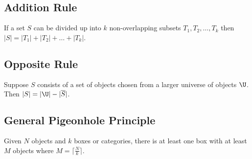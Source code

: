 \documentclass[letterpaper, 12pt]{math}
\begin{document}
\subsection*{Addition Rule}
If a set \( S \) can be divided up into \( k \) non-overlapping subsets
\( T_{1},T_{2},\dots,T_{k} \) then \( |S| = |T_{1}|+|T_{2}|+\dots+|T_{k}| \).

\subsection*{Opposite Rule}
Suppose \( S \) consists of a set of objects chosen from a larger universe of
objects \( \U \). Then \( |S| = |\U|-|\overline{S}| \).

\subsection*{General Pigeonhole Principle}
Given \( N \) objects and \( k \) boxes or categories, there is at least one box
with at least \( M \) objects where \( M = \lceil\frac{N}{k}\rceil \).
\end{document}
